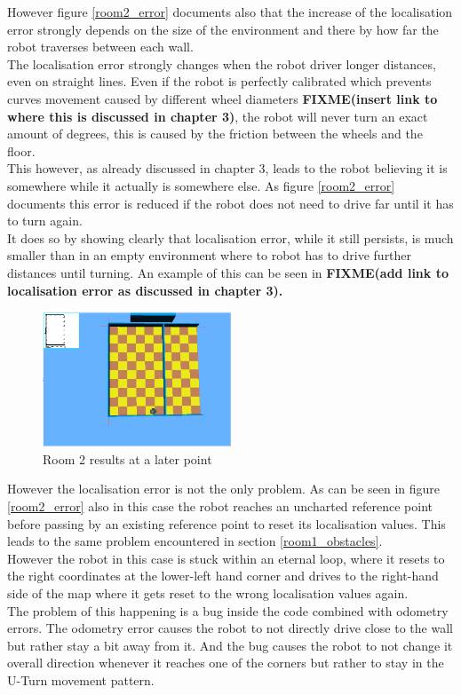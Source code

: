 However figure \ref{room2_error} documents also that the increase of the localisation error strongly depends on the size of the environment and there by how far the robot traverses between each wall. \\
The localisation error strongly changes when the robot driver longer distances, even on straight lines. Even if the robot is perfectly calibrated which prevents curves movement caused by different wheel diameters \textbf{FIXME(insert link to where this is discussed in chapter 3)}, the robot will never turn an exact amount of degrees, this is caused by the friction between the wheels and the floor. \\
This however, as already discussed in chapter 3, leads to the robot believing it is somewhere while it actually is somewhere else.  As figure \ref{room2_error} documents this error is reduced if the robot does not need to drive far until it has to turn again.\\
It does so by showing clearly that localisation error, while it still persists, is much smaller than in an empty environment where to robot has to drive further distances until turning. An example of this can be seen in\textbf{ FIXME(add link to localisation error as discussed in chapter 3).} \\[3ex]

\begin{figure}[h]
\centering
\includegraphics[width = 0.5\textwidth]{../../figures/map_results/save_corner_with_odometry_error_later.png}
\caption{Room 2 results at a later point}
\label{room2_results_later}
\end{figure}

However the localisation error is not the only problem. As can be seen in figure \ref{room2_error} also in this case the robot reaches an uncharted reference point before passing by an existing reference point to reset its localisation values. This leads to the same problem encountered in section \ref{room1_obstacles}. \\
However the robot in this case is stuck within an eternal loop, where it resets to the right coordinates at the lower-left hand corner and drives to the right-hand side of the map where it gets reset to the wrong localisation values again. \\
The problem of this happening is a bug inside the code combined with odometry errors. The odometry error causes the robot to not directly drive close to the wall but rather stay a bit away from it. And the bug causes the robot to not change it overall direction whenever it reaches one of the corners but rather to stay in the U-Turn movement pattern.

